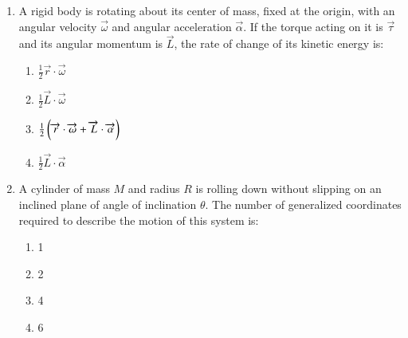 \documentclass[journal,9pt,onecolumn]{IEEEtran}
\begin{document}
\begin{enumerate}
\begin{multicols}{4}
    \begin{enumerate}
     \item $\overrightarrow{F} = 2z\hat{x} + 3z\hat{y} + 5y\hat{z}$
    \item $\overrightarrow{F} = 3z\hat{y} + 5y\hat{z}$
    \item $\overrightarrow{F} = 3x\hat{y} + 5y\hat{z}$
    \item $\overrightarrow{F} = 2\hat{x} + 5y\hat{z}$
    \end{enumerate}
\end{multicols}


\item A rigid body is rotating about its center of mass, fixed at the origin, with an angular velocity $\overrightarrow{\omega}$ and angular acceleration $\overrightarrow{\alpha}$. If the torque acting on it is $\overrightarrow{\tau}$ and its angular momentum is $\overrightarrow{L}$, the rate of change of its kinetic energy is:
\begin{multicols}{4}
\begin{enumerate}
  \item $\frac{1}{2}\overrightarrow{r}\cdot\overrightarrow{\omega}$
  \item $\frac{1}{2}\overrightarrow{L}\cdot\overrightarrow{\omega}$
    \item $\frac{1}{2}\left(\overrightarrow{r}\cdot\overrightarrow{\omega} + \overrightarrow{L}\cdot\overrightarrow{\alpha}\right)$
    \item $\frac{1}{2}\overrightarrow{L}\cdot\overrightarrow{\alpha}$
\end{enumerate}
\end{multicols}


\item A cylinder of mass $M$ and radius $R$ is rolling down without slipping on an inclined plane of angle of inclination $\theta$. The number of generalized coordinates required to describe the motion of this system is:
\begin{multicols}{4}
\begin{enumerate}
     \item 1
    \item 2
    \item 4
    \item 6
\end{enumerate}
\end{multicols}



\end{enumerate}
\end{document}
